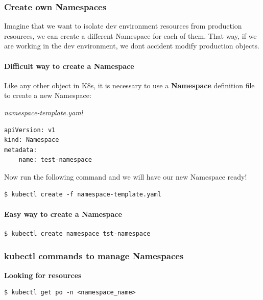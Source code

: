 \documentclass{article}
\newenvironment{codetemplate}[1][]{%
  \mybasecolorbox[#1]
  \itshape
}{%
  \endmybasecolorbox
}
\begin{document}
\subsubsection{Create own Namespaces}

Imagine that we want to isolate dev environment resources from production resources, we can create a different Namespace for each of them. That way, if we are working in the dev environment, we dont accident modify production objects.

\paragraph{Difficult way to create a Namespace}

Like any other object in K8s, it is necessary to use a \textbf{Namespace} definition file to create a new Namespace:

\begin{codetemplate}{namespace-template.yaml}
\begin{verbatim}
apiVersion: v1
kind: Namespace
metadata:
    name: test-namespace
\end{verbatim}
\end{codetemplate}

Now run the following command and we will have our new Namespace ready!

\begin{codetemplate}{}
\begin{verbatim}
$ kubectl create -f namespace-template.yaml
\end{verbatim}
\end{codetemplate}

\paragraph{Easy way to create a Namespace}

\begin{codetemplate}{}
\begin{verbatim}
$ kubectl create namespace tst-namespace
\end{verbatim}
\end{codetemplate}

\subsubsection{kubectl commands to manage Namespaces}

\textbf{Looking for resources}
\begin{codetemplate}{}
\begin{verbatim}
$ kubectl get po -n <namespace_name>
\end{verbatim}
\end{codetemplate}
\end{document}
